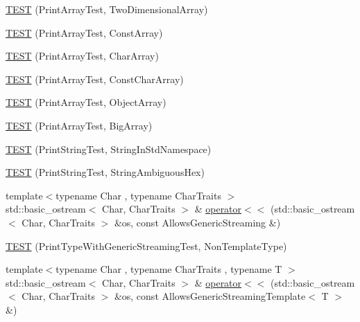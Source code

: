 \begin{DoxyCompactItemize}
\item 
\hyperlink{namespacetesting_1_1gtest__printers__test_ac366b9ec749b2499d21583d3b8f86273}{\-T\-E\-S\-T} (\-Print\-Array\-Test, \-Two\-Dimensional\-Array)
\item 
\hyperlink{namespacetesting_1_1gtest__printers__test_a8b5638f178c12f58707ca0f02a3b4d41}{\-T\-E\-S\-T} (\-Print\-Array\-Test, \-Const\-Array)
\item 
\hyperlink{namespacetesting_1_1gtest__printers__test_a82441850ddadc324b1a7ab57b4247bc7}{\-T\-E\-S\-T} (\-Print\-Array\-Test, \-Char\-Array)
\item 
\hyperlink{namespacetesting_1_1gtest__printers__test_af8e9c48c5a28dc9e02631f4527b11556}{\-T\-E\-S\-T} (\-Print\-Array\-Test, \-Const\-Char\-Array)
\item 
\hyperlink{namespacetesting_1_1gtest__printers__test_af91d8ad9d6c7547913fe05c7acc44114}{\-T\-E\-S\-T} (\-Print\-Array\-Test, \-Object\-Array)
\item 
\hyperlink{namespacetesting_1_1gtest__printers__test_a596493b56489aa1571fa26d1402e7116}{\-T\-E\-S\-T} (\-Print\-Array\-Test, \-Big\-Array)
\item 
\hyperlink{namespacetesting_1_1gtest__printers__test_abbd355e76033f0defd76c37523ad0f60}{\-T\-E\-S\-T} (\-Print\-String\-Test, \-String\-In\-Std\-Namespace)
\item 
\hyperlink{namespacetesting_1_1gtest__printers__test_ac20ee165500471e363011c3f664d2fb8}{\-T\-E\-S\-T} (\-Print\-String\-Test, \-String\-Ambiguous\-Hex)
\item 
{\footnotesize template$<$typename Char , typename Char\-Traits $>$ }\\std\-::basic\-\_\-ostream$<$ \-Char, \*
\-Char\-Traits $>$ \& \hyperlink{namespacetesting_1_1gtest__printers__test_a1eb0213095e639d357692066e8505887}{operator$<$$<$} (std\-::basic\-\_\-ostream$<$ \-Char, \-Char\-Traits $>$ \&os, const \-Allows\-Generic\-Streaming \&)
\item 
\hyperlink{namespacetesting_1_1gtest__printers__test_a9272037c799c4779e1d79476dad66cb6}{\-T\-E\-S\-T} (\-Print\-Type\-With\-Generic\-Streaming\-Test, \-Non\-Template\-Type)
\item 
{\footnotesize template$<$typename Char , typename Char\-Traits , typename T $>$ }\\std\-::basic\-\_\-ostream$<$ \-Char, \*
\-Char\-Traits $>$ \& \hyperlink{namespacetesting_1_1gtest__printers__test_a5464168e925b1adf29986c8e544e908e}{operator$<$$<$} (std\-::basic\-\_\-ostream$<$ \-Char, \-Char\-Traits $>$ \&os, const \-Allows\-Generic\-Streaming\-Template$<$ \-T $>$ \&)

\end{DoxyCompactItemize}
